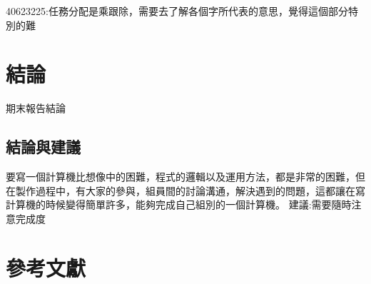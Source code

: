 \documentclass[12pt,,]{report}
\begin{document}
40623225:任務分配是乘跟除，需要去了解各個字所代表的意思，覺得這個部分特別的難

\hypertarget{ux7d50ux8ad6}{%
\chapter{結論}\label{ux7d50ux8ad6}}

期末報告結論

\hypertarget{ux7d50ux8ad6ux8207ux5efaux8b70}{%
\section{結論與建議}\label{ux7d50ux8ad6ux8207ux5efaux8b70}}

要寫一個計算機比想像中的困難，程式的邏輯以及運用方法，都是非常的困難，但在製作過程中，有大家的參與，組員間的討論溝通，解決遇到的問題，這都讓在寫計算機的時候變得簡單許多，能夠完成自己組別的一個計算機。
建議:需要隨時注意完成度

\hypertarget{ux53c3ux8003ux6587ux737b}{%
\chapter{參考文獻}\label{ux53c3ux8003ux6587ux737b}}
\end{document}
